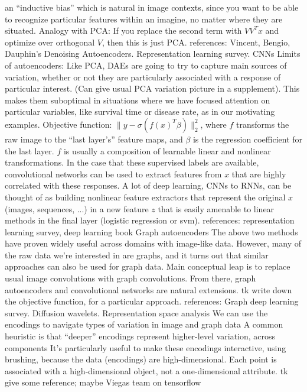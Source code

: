 \documentclass[11pt]{article}
\begin{document}
\begin{outline}
    an ``inductive bias'' which is natural in image contexts, since you want to
    be able to recognize particular features within an imagine, no matter where
    they are situated.
    \3 Analogy with PCA: If you replace the second term with $VV^{T}x$ and
    optimize over orthogonal $V$, then this is just PCA.
    \3 references: Vincent, Bengio, Dauphin's Denoising Autoencoders.
    Representation learning survey.
  \2 CNNs
    \3 Limits of autoencoders: Like PCA, DAEs are going to try to capture main
    sources of variation, whether or not they are particularly associated with a
    response of particular interest. (Can give usual PCA variation picture in a
    supplement). This makes them suboptimal in situations where we have focused
    attention on particular variables, like survival time or disease rate, as in
    our motivating examples.
    \3 Objective function: $\|y -
    \sigma\left(f\left(x\right)^{T}\beta\right)\|_{2}^{2}$, where $f$ transforms
    the raw image to the ``last layer's'' feature maps, and $\beta$ is the
    regression coefficient for the last layer. $f$ is usually a composition of
    learnable linear and nonlinear transformations.
    \3 In the case that these supervised labels are available, convolutional
    networks can be used to extract features from $x$ that are highly correlated
    with these responses. A lot of deep learning, CNNs to RNNs, can be thought
    of as building nonlinear feature extractors that represent the original $x$
    (images, sequences, ...) in a new feature $z$ that is easily amenable to
    linear methods in the final layer (logistic regression or svm).
    \3 references: representation learning survey, deep learning book
  \2 Graph autoencoders
    \3 The above two methods have proven widely useful across domains with
    image-like data. However, many of the raw data we're interested in are
    graphs, and it turns out that similar approaches can also be used for graph
    data.
    \3 Main conceptual leap is to replace usual image convolutions with graph
    convolutions. From there, graph autoencoders and convolutional networks are
    natural extensions.
    \3 tk write down the objective function, for a particular approach.
    \3 references: Graph deep learning survey. Diffusion wavelets.
  \2 Representation space analysis
    \3 We can use the encodings to navigate types of variation in image and
    graph data
    \3 A common heuristic is that ``deeper'' encodings represent higher-level
    variation, across components
    \3 It's particularly useful to make these encodings interactive, using
    brushing, because the data (encodings) are high-dimensional. Each point is
    associated with a high-dimensional object, not a one-dimensional attribute.
    \3 tk give some reference; maybe Viegas team on tensorflow


\end{outline}
\end{document}
